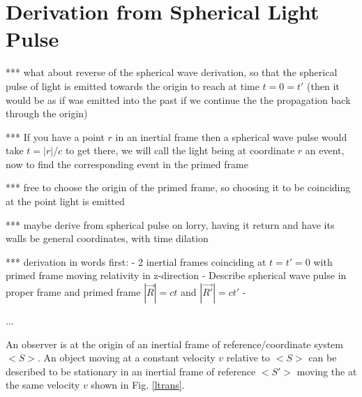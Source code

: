 \section{Derivation from Spherical Light Pulse} \label{spherical light pulse derivation}%

*** what about reverse of the spherical wave derivation, so that the spherical pulse of light is emitted towards the origin to reach at time $t=0=t'$ (then it would be as if was emitted into the past if we continue the the propagation back through the origin)

***
If you have a point $r$ in an inertial frame then a spherical wave pulse would take $t= |r|/c$ to get there, we will call the light being at coordinate $r$ an event, now to find the corresponding event in the primed frame

*** free to choose the origin of the primed frame, so choosing it to be coinciding at the point light is emitted

***
maybe derive from spherical pulse on lorry, having it return and have its walls be general coordinates, with time dilation

*** derivation in words first:
- 2 inertial frames coinciding at $t=t'=0$ with primed frame moving relativity in z-direction
- Describe spherical wave pulse in proper frame and primed frame $|\vec{R}|=ct$ and $|\vec{R'}|=ct'$
-

...

An observer is at the origin of an inertial frame of reference/coordinate system $<S>$. An object moving at a constant velocity $v$ relative to $<S>$ can be described to be stationary in an inertial frame of reference $<S'>$ moving the at the same velocity $v$ shown in Fig. \ref{ltrans}.

